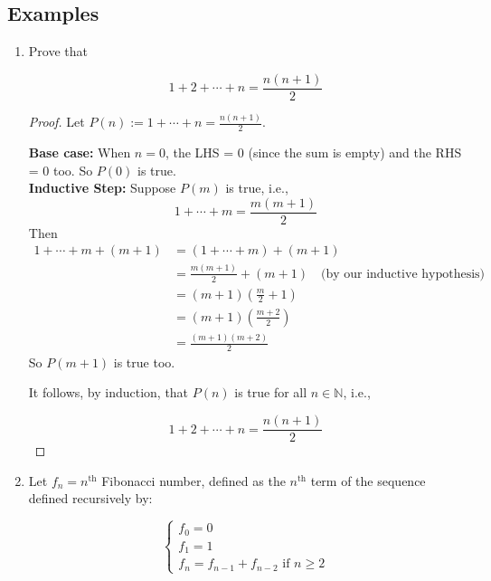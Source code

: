 \documentclass[11pt]{article}
\begin{document}
\subsection{Examples}
\begin{enumerate}
    \item Prove that

          \[
              1 + 2 + \cdots + n = \frac{n(n+1)}{2}
          \]

          \begin{proof}

              Let $P(n) := 1 + \cdots + n = \frac{n(n+1)}{2}$.

              \textbf{Base case:} When $n = 0$, the LHS = 0 (since the sum is empty) and the RHS = 0 too. So $P(0)$ is true. \\
              \textbf{Inductive Step:} Suppose $P(m)$ is true, i.e.,
              \[
                  1 + \cdots + m = \frac{m(m+1)}{2}
              \]
              Then
              \[
                  \begin{aligned}
                      1 + \cdots + m + (m+1) & = (1 + \cdots + m) + (m+1)                                            \\
                                             & = \frac{m(m+1)}{2} + (m+1) \quad \text{(by our inductive hypothesis)} \\
                                             & = (m+1)\left(\frac{m}{2} + 1\right)                                   \\
                                             & = (m+1)\left(\frac{m+2}{2}\right)                                     \\
                                             & = \frac{(m+1)(m+2)}{2}
                  \end{aligned}
              \]
              So $P(m+1)$ is true too.

              It follows, by induction, that $P(n)$ is true for all $n \in \mathbb{N}$, i.e.,

              \[
                  1 + 2 + \cdots + n = \frac{n(n+1)}{2}
              \]
          \end{proof}
    \item Let $f_n = n^{\text{th}}$ Fibonacci number, defined as the $n^{\text{th}}$ term
          of the sequence defined recursively by:

          \[
              \left\{
              \begin{array}{l}
                  f_0 = 0 \\
                  f_1 = 1 \\
                  f_n = f_{n-1} + f_{n-2} \text{ if } n \geq 2
              \end{array}
              \right.
          \]


\end{enumerate}
\end{document}
